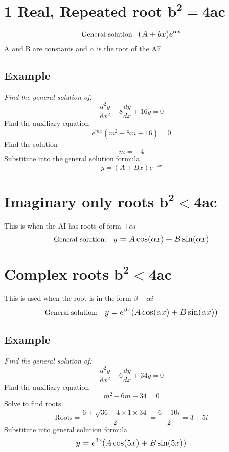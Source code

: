 \documentclass{article}[18pt]
\begin{document}
\section{1 Real, Repeated root $\mathbf{b^2=4ac}$}
$$\textrm{General solution}: \mathlarger{(A+bx)e^{\alpha x}}$$
A and B are constants and $\alpha$ is the root of the AE
\subsection{Example}
\textit{Find the general solution of:}
$$\frac{d^2y}{dx^2}+8\frac{dy}{dx}+16y=0$$
Find the auxiliary equation
$$e^{mx}(m^2+8m+16)=0$$
Find the solution
$$m=-4$$
Substitute into the general solution formula
$$y=(A+Bx)e^{-4x}$$
\section{Imaginary only roots $\mathbf{b^2<4ac}$}
This is when the AI has roots of form $\pm \alpha i$
$$\textrm{General solution:} \quad \mathlarger{y=A\cos(\alpha x)+B\sin(\alpha x)}$$
\newpage
\section{Complex roots $\mathbf{b^2<4ac}$}
This is used when the root is in the form $\beta\pm\alpha i$
$$\textrm{General solution:} \quad \mathlarger{y=e^{\beta x}(A\cos(\alpha x)+B\sin(\alpha x))}$$
\subsection{Example}
\textit{Find the general solution of:}
$$\frac{d^2y}{dx^2}-6\frac{dy}{dx}+34y=0$$
Find the auxiliary equation
$$m^2-6m+34=0$$
Solve to find roots
$$\textrm{Roots}=\frac{6\pm\sqrt{36-4\times1\times34}}{2}=\frac{6\pm10i}{2}=3\pm5i$$
Substitute into general solution formula
$$\mathlarger{y=e^{3x}(A\cos(5x)+B\sin(5x))}$$
\end{document}
